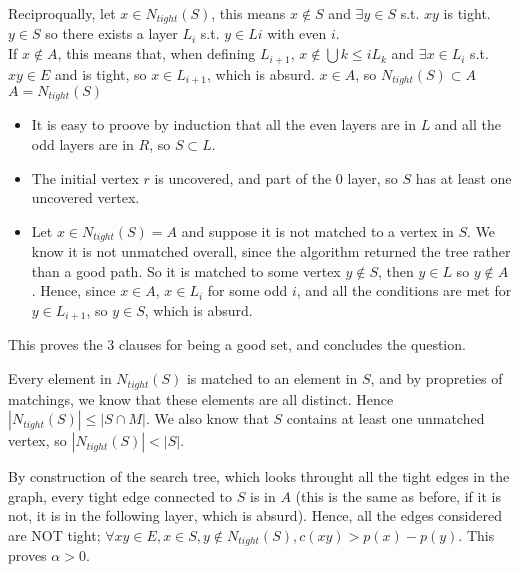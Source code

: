 \documentclass{scrartcl}
\begin{document}
Reciproqually, let \( x \in N_{tight}(S) \), this means \(x \not \in S \) and \( \exists y \in S \) s.t. \( xy \) is tight. \( y \in S \) so there exists a layer \( L_{i} \) s.t. \( y \in L{i} \) with even \( i \). \\
If \( x \not \in A \), this means that, when defining \( L_{i+1} \), \( x \not \in \bigcup {k \leq i}L_k \) and \( \exists x \in L_i \) s.t. \( xy \in E\) and is tight, so \( x \in L_{i+1}\), which is absurd. \(x \in A\), so \( N_{tight}(S) \subset A \) \\

\( A  = N_{tight}(S) \)

\begin{itemize}
	\item It is easy to proove by induction that all the even  layers are in \( L \) and all the odd layers are in \( R \), so \( S \subset L \).
	\item The initial vertex \( r \) is uncovered, and part of the 0 layer, so \( S \) has at least one uncovered vertex.
	\item Let \( x \in N_{tight}(S) = A \) and suppose it is not matched to a vertex in \( S \). We know it is not unmatched overall, since the algorithm returned the tree rather than a good path. So it is matched to some vertex \( y \not \in S \), then \( y \in L \) so \( y \not \in A \). Hence, since \( x \in A\), \( x \in L_{i} \) for some odd \( i \), and all the conditions are met for \( y \in L_{i+1} \), so \( y \in S \), which is absurd.

\end{itemize}
This proves the 3 clauses for being a good set, and concludes the question.




Every element in \( N_{tight}(S) \) is matched to an element in \(S \), and by propreties of matchings, we know that these elements are all distinct. Hence \( |N_{tight}(S)| \leq |S \cap M| \). We also know that \( S \) contains at least one unmatched vertex, so \( |N_{tight}(S)| < |S| \).

By construction of the search tree, which looks throught all the tight edges in the graph, every tight edge connected to \( S \) is in \( A \) (this is the same as before, if it is not, it is in the following layer, which is absurd). 
Hence, all the edges considered are NOT tight; \( \forall xy \in E, x \in S, y \not \in N_{tight}(S), c(xy) > p(x) - p(y) \). This proves \( \alpha > 0 \).

\end{document}
